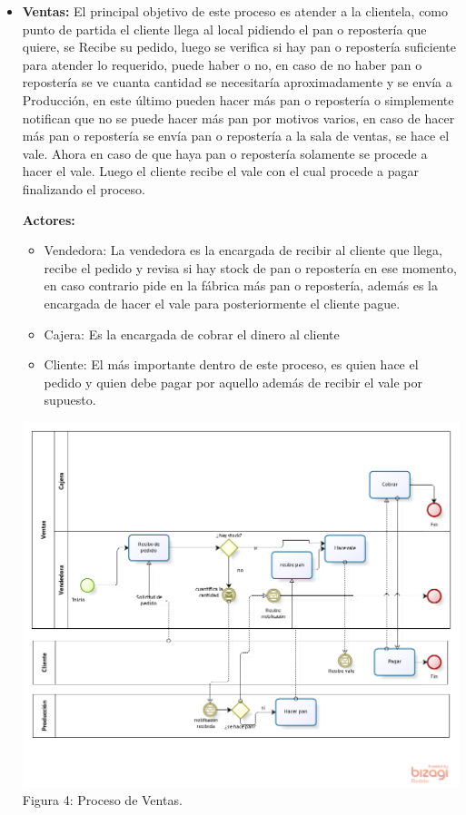 \begin{itemize}
\item \textbf{Ventas:} El principal objetivo de este proceso es atender a la clientela, como punto de partida el cliente llega al local pidiendo el pan o repostería que quiere, se Recibe su pedido, luego se verifica si hay pan o repostería suficiente para atender lo requerido, puede haber o no, en caso de no haber pan o repostería se ve cuanta cantidad se necesitaría aproximadamente y se envía a Producción, en este último pueden hacer más pan o repostería o simplemente notifican que no se puede hacer más pan por motivos varios, en caso de hacer más pan o repostería se envía pan o repostería a la sala de ventas, se hace el vale. Ahora en caso de que haya pan o repostería solamente se procede a hacer el vale. Luego el cliente recibe el vale con el cual procede a pagar finalizando el proceso.

\textbf{Actores:}
\begin{itemize}
\item Vendedora: La vendedora es la encargada de recibir al cliente que llega, recibe el pedido y revisa si hay stock de pan o repostería en ese momento, en caso contrario pide en la fábrica más pan o repostería, además es la encargada de hacer el vale para posteriormente el cliente pague.
\item Cajera: Es la encargada de cobrar el dinero al cliente
\item Cliente: El más importante dentro de este proceso, es quien hace el pedido y quien debe pagar por aquello además de recibir el vale por supuesto.
\end{itemize} 

\begin{center}
\includegraphics[width=15cm]{./imagenes/ventas.png}\\
Figura 4: Proceso de Ventas.
\end{center}


\end{itemize}
